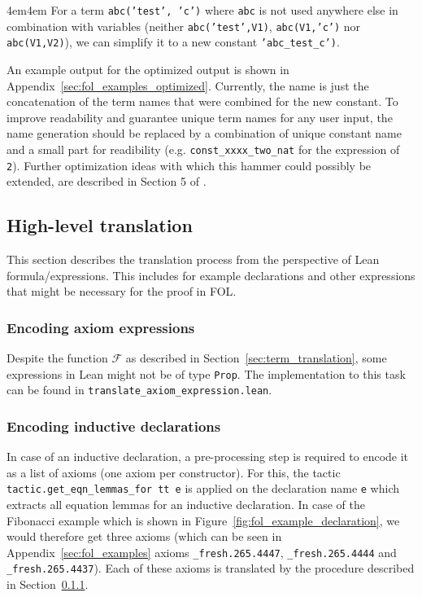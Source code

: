 \documentclass[a4paper]{article}
\newcommand{\F}[0]{$\mathcal{F}$ }
\begin{document}
\begingroup
\leftskip4em\rightskip4em
For a term \texttt{abc('test', 'c')} where \texttt{abc} is not used anywhere else in combination with variables (neither \texttt{abc('test',V1)}, \texttt{abc(V1,'c')} nor \texttt{abc(V1,V2)}), we can simplify it to a new constant \texttt{'abc\_test\_c')}.
\par
\endgroup

An example output for the optimized output is shown in Appendix~\ref{sec:fol_examples_optimized}. Currently, the name is just the concatenation of the term names that were combined for the new constant. To improve readability and guarantee unique term names for any user input, the name generation should be replaced by a combination of unique constant name and a small part for readibility (e.g. \texttt{const\_xxxx\_two\_nat} for the expression of \texttt{2}).
Further optimization ideas with which this hammer could possibly be extended, are described in Section 5 of \cite{CoqHammer}. 

\subsection{High-level translation}

This section describes the translation process from the perspective of Lean formula/expressions. This includes for example declarations and other expressions that might be necessary for the proof in FOL.

\subsubsection{Encoding axiom expressions}
\label{sec:axiom_expressions}

Despite the function \F as described in Section~\ref{sec:term_translation}, some expressions in Lean might not be of type \texttt{Prop}. The implementation to this task can be found in \texttt{translate\_axiom\_expression.lean}.

\subsubsection{Encoding inductive declarations}

In case of an inductive declaration, a pre-processing step is required to encode it as a list of axioms (one axiom per constructor). For this, the tactic \texttt{tactic.get\_eqn\_lemmas\_for tt e} is applied on the declaration name \texttt{e} which extracts all equation lemmas for an inductive declaration. In case of the Fibonacci example which is shown in Figure~\ref{fig:fol_example_declaration}, we would therefore get three axioms (which can be seen in Appendix~\ref{sec:fol_examples} axioms \texttt{\_fresh.265.4447}, \texttt{\_fresh.265.4444} and \texttt{\_fresh.265.4437}). Each of these axioms is translated by the procedure described in Section~\ref{sec:axiom_expressions}.
\end{document}
